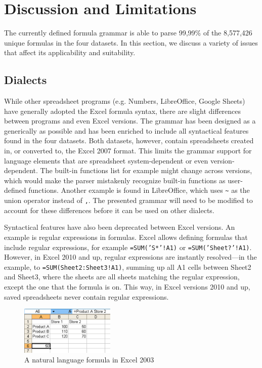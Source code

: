 \documentclass[times]{smrauth}
\begin{document}
\section{Discussion and Limitations}
\label{sec:discussion}
The currently defined formula grammar is able to parse 99,99\% of the 8,577,426 unique formulas in the four datasets. In this section, we discuss a variety of issues that affect its applicability and suitability.

\subsection{Dialects}

While other spreadsheet programs (e.g. Numbers, LibreOffice, Google Sheets) have generally adopted the Excel formula syntax, there are slight differences between programs and even Excel versions.
The grammar has been designed as a generically as possible and has been enriched to include all syntactical features found in the four datasets.
Both datasets, however, contain spreadsheets created in, or converted to, the Excel 2007 format.
This limits the grammar support for language elements that are spreadsheet system-dependent or even version-dependent.
The built-in functions list for example might change across versions, which would make the parser mistakenly recognize built-in functions as user-defined functions.
Another example is found in LibreOffice, which uses \texttt{\~} as the union operator instead of \texttt{,}.
The presented grammar will need to be modified to account for these differences before it can be used on other dialects.

Syntactical features have also been deprecated between Excel versions.
An example is regular expressions in formulas.
Excel allows defining formulas that include regular expressions, for example \texttt{=SUM('S*'!A1)} or \texttt{=SUM('Sheet?'!A1)}.
However, in Excel 2010 and up, regular expressions are instantly resolved---in the example, to  \texttt{=SUM(Sheet2:Sheet3!A1)}, summing up all A1 cells between Sheet2 and Sheet3, where the sheets are all sheets matching the regular expression, except the one that the formula is on.
This way, in Excel versions 2010 and up, saved spreadsheets never contain regular expressions.
\begin{figure}
	\centering
	\includegraphics[width=0.4\textwidth]{img/labels}
	\caption{A natural language formula in Excel 2003}
	\label{fig:labels}
\end{figure}
\end{document}
